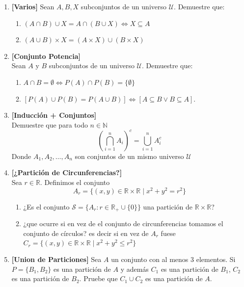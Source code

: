 \documentclass[letterpaper,11pt]{article}
\newcommand{\R}{\mathbb R}
\newcommand{\N}{\mathbb N}
\newcommand{\U}{\mathcal U}
\theoremstyle{plain}
\begin{document}
\begin{enumerate}[\bf P1.]
    \item \textbf{[Varios]} Sean $A,B,X$ subconjuntos de un universo $\mathcal{U}$. Demuestre que:
        \begin{enumerate}
            \item $(A\cap B)\cup X= A \cap (B\cup X) \iff X \subseteq A$
            \item $(A\cup B)\times X =(A \times X)\cup (B \times X)$
        \end{enumerate}

    \item \textbf{[Conjunto Potencia]} \\
        Sean $A$ y $B$ subconjuntos de un universo $\U$. Demuestre que:
        \begin{enumerate}
            \item $A \cap B = \emptyset \iff P(A)\cap P(B)=\{\emptyset \}$
            \item $[P(A) \cup P(B)=P(A \cup B)] \iff [A\subseteq B \lor B \subseteq A]$.
        \end{enumerate} 
        
    \item \textbf{[Inducción + Conjuntos]}\\
        Demuestre que para todo $n\in \N$ 
            $$\displaystyle \left( \bigcap_{i=1}^n A_i \right)^c=\bigcup_{i=1}^{n}A_{i}^{c}$$
        Donde $A_1,A_2, \dots , A_n$ son conjuntos de un mismo universo $\mathcal{U}$
        
    \item \textbf{[¿Partición de Circunferencias?]} \\ Sea $r \in \mathbb{R}$. Definimos el conjunto  $$ A_r = \{ (x,y) \in \mathbb{R} \times \mathbb{R} \mid x^{2} + y^{2} = r^2 \}$$
        \begin{enumerate}
            \item ¿Es el conjunto $\displaystyle \mathcal{S}= \{ A_r: r\in \R_{+}\cup \{0\} \}$  una partición de $\R\times \R$?
            \item ¿que ocurre si en vez de el conjunto de circunferencias tomamos el conjunto de círculos? es decir si en vez de $A_r$ fuese $C_r=  \{ (x,y) \in \mathbb{R} \times \mathbb{R} \mid x^{2} + y^{2} \leq r^2 \}$
        \end{enumerate}
        
        \item \textbf{[Union de Particiones]} Sea $A$ un conjunto con al menos 3 elementos. Si $P=\{B_1,B_2\}$ es una partición de $A$ y además $C_1$ es una partición de $B_1$, $C_2$ es una partición de $B_2$. Pruebe que $C_1 \cup C_2$ es una partición de $A$.
\end{enumerate}
\end{document}
